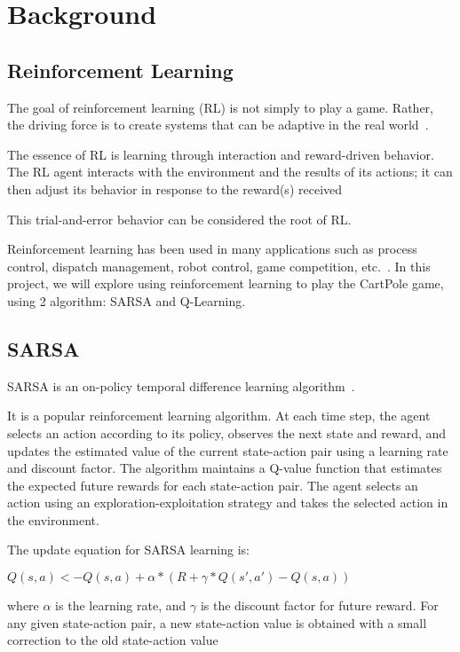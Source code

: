 \section{Background}

\subsection{Reinforcement Learning}
The goal of reinforcement learning (RL) is not simply to play a game. Rather, the driving force is to create systems that can be adaptive in the real world~\cite{Arulkumaran_2017}.

The essence of RL is learning through interaction and reward-driven behavior. The RL agent interacts with the environment and the results of its actions; it can then adjust its behavior in
response to the reward(s) received~\citep{Arulkumaran_2017}

This trial-and-error behavior can be considered the root of RL.

Reinforcement learning has been used in many applications such as process control, dispatch management, robot control, game competition, etc.~\citep{qiang2011reinforcement}. In this project, we
will explore using reinforcement learning to play the CartPole game, using 2 algorithm: SARSA and Q-Learning.

\subsection{SARSA}
SARSA is an on-policy temporal difference learning algorithm~\citep{sutton2018reinforcement}.

It is a popular reinforcement learning algorithm. At each time step, the agent selects an action according to its policy, observes the next state and reward, and updates the estimated value of the current state-action pair using a learning rate and discount factor. 
The algorithm maintains a Q-value function that estimates the expected future rewards for each state-action pair. The agent selects an action using an exploration-exploitation strategy and takes the selected action in the environment.

The update equation for SARSA learning is:

$Q(s,a) <- Q(s,a) + \alpha*(R + \gamma*Q(s',a') - Q(s,a))$

where $\alpha$ is the learning rate, and $\gamma$ is the discount factor for future reward. For any given state-action pair, a new state-action value is obtained
with a small correction to the old state-action value~\citep{graepel2004learning}

